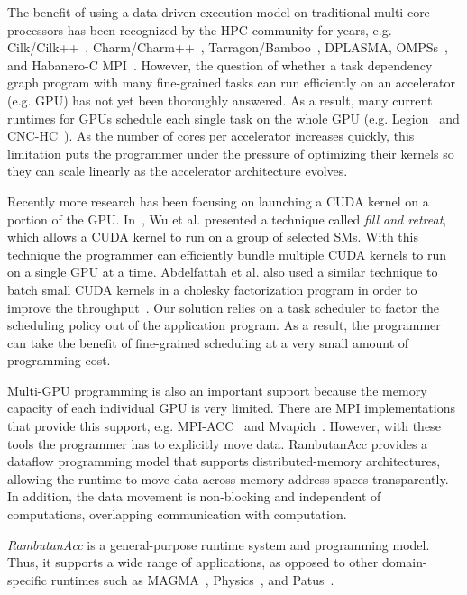The benefit of using a data-driven execution model on traditional multi-core processors has been recognized by the HPC community for years, e.g. Cilk/Cilk++~\cite{cilk,BlumofeJoKu95}, Charm/Charm++~\cite{charm++}, Tarragon/Bamboo~\cite{cicotti11:dissertation,bamboo, bamboo-LU, bambooThesis}, DPLASMA\cite{dplasma,Bosilca:2012:DAGuE}, OMPSs~\cite{ompss,nexus}, and Habanero-C MPI~\cite{Chatterjee:2013:HCMPI}.
However, the question of whether a task dependency graph program with many fine-grained tasks can run efficiently on an accelerator (e.g. GPU) has not yet been thoroughly answered.
As a result, many current runtimes for GPUs schedule each single task on the whole GPU (e.g. Legion~\cite{legion} and CNC-HC~\cite{cnc-hc}).
As the number of cores per accelerator increases quickly, this limitation puts the programmer under the pressure of optimizing their kernels so they can scale linearly as the accelerator architecture evolves.

Recently more research has been focusing on launching a CUDA kernel on a portion of the GPU.
In~\cite{fillNRetreat}, Wu et al. presented a technique called {\em fill and retreat}, which allows a CUDA kernel to run on a group of selected SMs.
With this technique the programmer can efficiently bundle multiple CUDA kernels to run on a single GPU at a time.
Abdelfattah et al. also used a similar technique to batch small CUDA kernels in a cholesky factorization program in order to improve the throughput~\cite{batchedCholesky}.
Our solution relies on a task scheduler to factor the scheduling policy out of the application program.
As a result, the programmer can take the benefit of fine-grained scheduling at a very small amount of programming cost.

Multi-GPU programming is also an important support because the memory capacity of each individual GPU is very limited.
There are MPI implementations that provide this support, e.g. MPI-ACC~\cite{mpiacc, mpiacc1} and Mvapich~\cite{mvapich2gpu}.
However, with these tools the programmer has to explicitly move data.
RambutanAcc provides a dataflow programming model that supports distributed-memory architectures, allowing the runtime to move data across memory address spaces transparently.
In addition, the data movement is non-blocking and independent of computations, overlapping communication with computation.

{\em RambutanAcc} is a general-purpose runtime system and programming model.
Thus, it supports a wide range of applications, as opposed to other domain-specific runtimes such as MAGMA~\cite{MAGMA}, Physics~\cite{physics}, and Patus~\cite{patus}.

